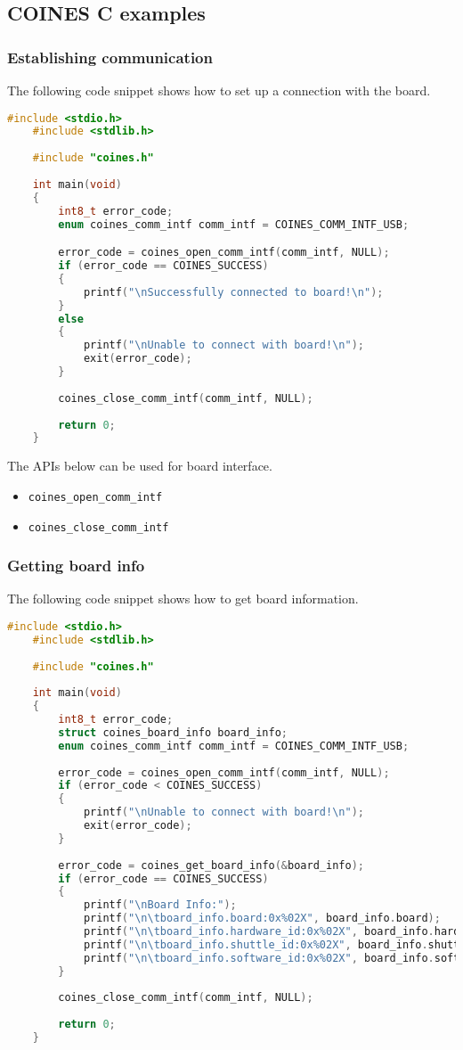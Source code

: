 \documentclass{article}
\begin{document}
\subsection{COINES C examples}
\subsubsection{Establishing communication}
The following code snippet shows how to set up a connection with the board.
\begin{lstlisting}[language=c]
	#include <stdio.h>
	#include <stdlib.h>
	
	#include "coines.h"
	
	int main(void)
	{
		int8_t error_code;
		enum coines_comm_intf comm_intf = COINES_COMM_INTF_USB;

		error_code = coines_open_comm_intf(comm_intf, NULL);
		if (error_code == COINES_SUCCESS)
		{
			printf("\nSuccessfully connected to board!\n");
		}
		else
		{
			printf("\nUnable to connect with board!\n");
			exit(error_code);
		}
	
		coines_close_comm_intf(comm_intf, NULL);
	
		return 0;
	}

\end{lstlisting}
The APIs below can be used for board interface.
\begin{itemize}
	\item \texttt{coines\_open\_comm\_intf}
	\item \texttt{coines\_close\_comm\_intf}
\end{itemize}

\subsubsection{Getting board info}
The following code snippet shows how to get board information.
\begin{lstlisting}[language=c]
	#include <stdio.h>
	#include <stdlib.h>
	
	#include "coines.h"
	
	int main(void)
	{
		int8_t error_code;
		struct coines_board_info board_info;
		enum coines_comm_intf comm_intf = COINES_COMM_INTF_USB;
	
		error_code = coines_open_comm_intf(comm_intf, NULL);
		if (error_code < COINES_SUCCESS)
		{
			printf("\nUnable to connect with board!\n");
			exit(error_code);
		}
	
		error_code = coines_get_board_info(&board_info);
		if (error_code == COINES_SUCCESS)
		{
			printf("\nBoard Info:");
			printf("\n\tboard_info.board:0x%02X", board_info.board);
			printf("\n\tboard_info.hardware_id:0x%02X", board_info.hardware_id);
			printf("\n\tboard_info.shuttle_id:0x%02X", board_info.shuttle_id);
			printf("\n\tboard_info.software_id:0x%02X", board_info.software_id);
		}
	
		coines_close_comm_intf(comm_intf, NULL);
	
		return 0;
	}
	
\end{lstlisting}
\end{document}
